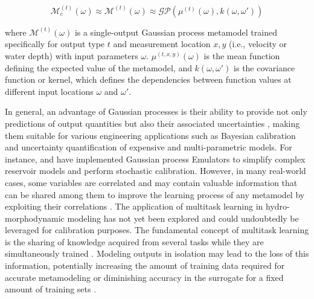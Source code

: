 \documentclass[draft,linenumbers,onecolumn]{agujournal2019} %
\begin{document}
\begin{equation} \label{eq:sogpe}
	\mathcal{M}_c^{(t)}(\omega) \approx \mathcal{M}^{(t)}(\omega) \approx \mathcal{GP}(\mu^{(t)}(\omega), k(\omega, \omega'))
\end{equation}

where $\mathcal{M}^{(t)}(\omega)$ is a single-output Gaussian process metamodel trained specifically for output type $t$ and measurement location $x,y$  (i.e., velocity or water depth) with input parameters $\omega$.  $\mu^{(t,x,y)}(\omega)$ is the mean function defining the expected value of the metamodel, and $k(\omega, \omega')$ is the covariance function or kernel, which defines the dependencies between function values at different input locations $\omega$ and $\omega'$. 

In general, an advantage of Gaussian processes is their ability to provide not only predictions of output quantities but also their associated uncertainties \cite{lindholm2022machine}, making them suitable for various engineering applications such as Bayesian calibration and uncertainty quantification of expensive and multi-parametric models. For instance,  and  have implemented Gaussian process Emulators to simplify complex reservoir models and perform stochastic calibration. However, in many real-world cases, some variables are correlated and may contain valuable information that can be shared among them to improve the learning process of any metamodel by exploiting their correlations \cite{breiman1997predicting}. The application of multitask learning in hydro-morphodynamic modeling has not yet been explored and could undoubtedly be leveraged for calibration purposes. The fundamental concept of multitask learning is the sharing of knowledge acquired from several tasks while they are simultaneously trained \cite{caruana1997multitask}. Modeling outputs in isolation may lead to the loss of this information, potentially increasing the amount of training data required for accurate metamodeling or diminishing accuracy in the surrogate for a fixed amount of training sets \cite{liu2018remarks}.
\end{document}
